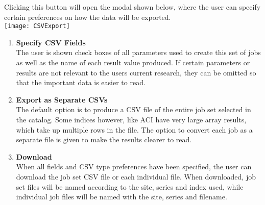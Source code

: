 Clicking this button will open the modal shown below, where the user can specify certain preferences on how the data will be exported.\\
\texttt{[image: CSVExport]}
\begin{enumerate}
  \item \textbf{Specify CSV Fields}\\ The user is shown check boxes of all parameters used to create this set of jobs as well as the name of each result value produced. If certain parameters or results are not relevant to the user\textquotesingle s current research, they can be omitted so that the important data is easier to read.
  \item \textbf{Export as Separate CSVs}\\ The default option is to produce a CSV file of the entire job set selected in the catalog. Some indices however, like ACI have very large array results, which take up multiple rows in the file. The option to convert each job as a separate file is given to make the results clearer to read.
  \item \textbf{Download}\\ When all fields and CSV type preferences have been specified, the user can download the job set CSV file or each individual file. When downloaded, job set files will be named according to the site, series and index used, while individual job files will be named with the site, series and filename.
\end{enumerate}
